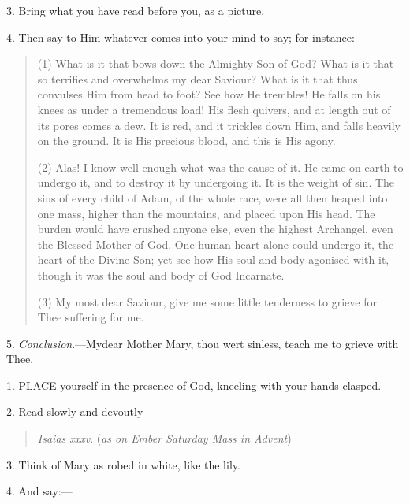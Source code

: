 3. Bring what you have read
before you, as a picture.

4. Then say to Him whatever
comes into your mind to say; for instance:—

\begin{quote}

(1) What is it that bows down
the Almighty Son of God? What is it that so terrifies and overwhelms
my dear Saviour? What is it that thus convulses Him from head to foot?
See how He trembles! He falls on his knees as under a tremendous load!
His flesh quivers, and at length out of its pores comes a dew. It is
red, and it trickles down Him, and falls heavily on the ground. It is
His precious blood, and this is His agony.

(2) Alas! I know well enough
what was the cause of it. He came on earth to undergo it, and to
destroy it by undergoing it. It is the weight of sin. The sins of
every child of Adam, of the whole race, were all then heaped
into one mass, higher than the mountains, and placed upon His head.
The burden would have crushed anyone else, even the highest Archangel,
even the Blessed Mother of God. One human heart alone could undergo
it, the heart of the Divine Son; yet see how His soul and body
agonised with it, though it was the soul and body of God Incarnate.

(3) My most dear Saviour, give
me some little tenderness to grieve for Thee suffering for me.

\end{quote}

5. \emph{Conclusion}.—My\emph{}dear
Mother Mary, thou wert sinless, teach me to grieve with Thee.


1. PLACE
yourself in the presence of God, kneeling with your hands clasped.

2. Read slowly and devoutly

\begin{quote}

\emph{Isaias xxxv}.
(\emph{as on Ember Saturday Mass in Advent})

\end{quote}

3. Think of Mary as robed in
white, like the lily.

4. And say:—

